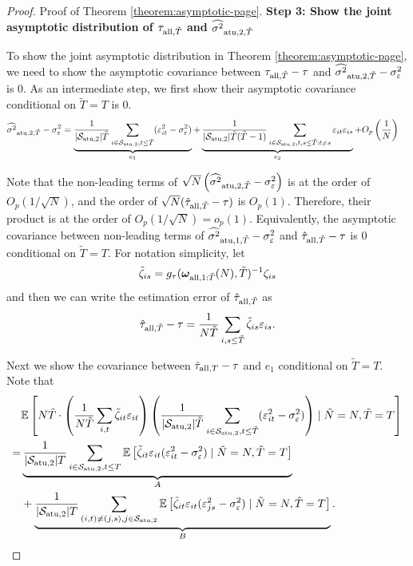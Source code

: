 \begin{proof}{Proof of Theorem \ref{theorem:asymptotic-page}.}
\textbf{Step 3: Show the joint asymptotic distribution of $\tau_{\mathrm{all},\tilde{T}}$ and $\widehat{\sigma^2}_{\mathrm{atu},2,\tilde{T}}$}

To show the joint asymptotic distribution in Theorem \eqref{theorem:asymptotic-page}, we need to show the asymptotic covariance between $\tau_{\mathrm{all},\tilde{T}} - \tau$ and $\widehat{\sigma^2}_{\mathrm{atu},2,\tilde{T}} - \sigma_\varepsilon^2$ is 0. As an intermediate step, we first show their asymptotic covariance conditional on $\tilde{T} = T$ is 0. 
\begin{align*}
   & \widehat{\sigma^2}_{\mathrm{atu},2,\tilde{T}} - \sigma_\varepsilon^2 = \underbrace{\frac{1}{|\mathcal{S}_{\mathrm{atu},2}| \tilde{T}} \sum_{i \in \mathcal{S}_{\mathrm{atu},2},t \leq \tilde{T}} (\varepsilon_{it}^2 - \sigma_\varepsilon^2 ) }_{e_1}
  + \underbrace{\frac{1}{|\mathcal{S}_{\mathrm{atu},2}| \tilde{T} (\tilde{T}-1)} \sum_{i\in \mathcal{S}_{\mathrm{atu},2}, t,s\leq \tilde{T}: t\neq s} \varepsilon_{it} \varepsilon_{is}}_{e_2}   +  O_p\left( \frac{1}{N} \right)
\end{align*}

Note that the non-leading terms of $\sqrt{N} \left(\widehat{\sigma^2}_{\mathrm{atu},2,\tilde{T}} - \sigma^2_\varepsilon\right)$ is at the order of $O_p\left(1/\sqrt{N}\right)$, and the order of $\sqrt{N}(\hat{\tau}_{\mathrm{all},\tilde{T}} - \tau)$ is $O_p(1)$. Therefore, their product is at the order of $O_p\left(1/\sqrt{N}\right) = o_p(1)$. Equivalently, the asymptotic covariance between non-leading terms of $\widehat{\sigma^2}_{\mathrm{atu},1,\tilde{T}} - \sigma^2_\varepsilon$ and $\hat{\tau}_{\mathrm{all},\tilde{T}} - \tau$ is $0$ conditional on $\tilde{T} = T$. For notation simplicity, let 
\[\tilde{\zeta}_{is} = g_\tau(\bm{\omega}_{\mathrm{all},1:\tilde{T}}(N),\tilde{T})^{-1} \zeta_{is}  \]
and then we can write the estimation error of $\hat{\tau}_{\mathrm{all},\tilde{T}}$ as 
\[\hat{\tau}_{\mathrm{all},\tilde{T}} - \tau = \frac{1}{N\tilde{T}} \sum_{i, s\leq \tilde{T}} \tilde{\zeta}_{is} \varepsilon_{is}. \]

Next we show the covariance between $\hat{\tau}_{\mathrm{all},T} - \tau$ and $e_1$ conditional on $\tilde{T} = T$. Note that
\begin{align*}
    & \mathbb{E}\left[ N \tilde{T} \cdot \left( \frac{1}{N\tilde{T}} \sum_{i,t} \tilde\zeta_{it} \varepsilon_{it} \right) \left(  \frac{1}{|\mathcal{S}_{\mathrm{atu},2}|\tilde{T}} \sum_{i\in\mathcal{S}_{\mathrm{atu},2},t\leq\tilde{T}} (\varepsilon_{it}^2 - \sigma_\varepsilon^2 ) \right)\mid \tilde{N} = N,  \tilde{T} = T \right] \\
    =& \underbrace{\frac{1}{ |\mathcal{S}_{\mathrm{atu},2}| T} \sum_{i \in \mathcal{S}_{\mathrm{atu},2},t \leq T} \mathbb{E}\left[ \tilde\zeta_{it} \varepsilon_{it} (\varepsilon_{it}^2 - \sigma_\varepsilon^2)\mid \tilde{N} = N,  \tilde{T} = T\right]}_{A} \\ 
    &+ \underbrace{\frac{1}{ |\mathcal{S}_{\mathrm{atu},2}| T} \sum_{(i,t) \neq (j,s), j \in \mathcal{S}_{\mathrm{atu},2}} \mathbb{E}\left[ \tilde\zeta_{it} \varepsilon_{it} (\varepsilon_{js}^2 - \sigma_\varepsilon^2) \mid \tilde{N} = N,  \tilde{T} = T\right]}_{B}.
\end{align*}


\end{proof}

